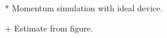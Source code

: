 \documentclass[conference]{IEEEtran}
\begin{document}
\begin{table}[!t]
\begin{threeparttable}
{\begin{tabular}{|c|c|c|c|c|c|c|}
\end{tabular}%
 }
\begin{tablenotes}
  \item[*] Momentum simulation with ideal device.
  \item[+] Estimate from figure.
  \end{tablenotes}
\end{threeparttable} 
\vspace{-0.25in}
\end{table}

\end{document}

